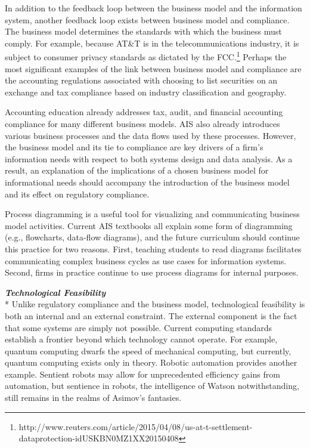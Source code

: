 \documentclass[12pt]{article}
\newcommand{\SubSubSection}[1]{{\centering{}\normalsize{}\textbf{\emph{#1}}}\\*\indent{}}
\begin{document}
In addition to the feedback loop between the business model and the information system, another feedback loop exists between business model and compliance. The business model determines the standards with which the business must comply. For example, because AT\&T is in the telecommunications industry, it is subject to consumer privacy standards as dictated by the FCC.\footnote{http://www.reuters.com/article/2015/04/08/us-at-t-settlement-dataprotection-idUSKBN0MZ1XX20150408} Perhaps the most significant examples of the link between business model and compliance are the accounting regulations associated with choosing to list securities on an exchange and tax compliance based on industry classification and geography.

Accounting education already addresses tax, audit, and financial accounting compliance for many different business models. AIS also already introduces various business processes and the data flows used by these processes. However, the business model and its tie to compliance are key drivers of a firm's information needs with respect to both systems design and data analysis. As a result, an explanation of the implications of a chosen business model for informational needs should accompany the introduction of the business model and its effect on regulatory compliance.

Process diagramming is a useful tool for visualizing and communicating business model activities. Current AIS textbooks all explain some form of diagramming (e.g., flowcharts, data-flow diagrams), and the future curriculum should continue this practice for two reasons. First, teaching students to read diagrams facilitates communicating complex business cycles as use cases for information systems. Second, firms in practice continue to use process diagrams for internal purposes.

\SubSubSection{Technological Feasibility}
Unlike regulatory compliance and the business model, technological feasibility is both an internal and an external constraint. The external component is the fact that some systems are simply not possible. Current computing standards establish a frontier beyond which technology cannot operate. For example, quantum computing dwarfs the speed of mechanical computing, but currently, quantum computing exists only in theory. Robotic automation provides another example. Sentient robots may allow for unprecedented efficiency gains from automation, but sentience in robots, the intelligence of Watson notwithstanding, still remains in the realms of Asimov's fantasies.
\end{document}
